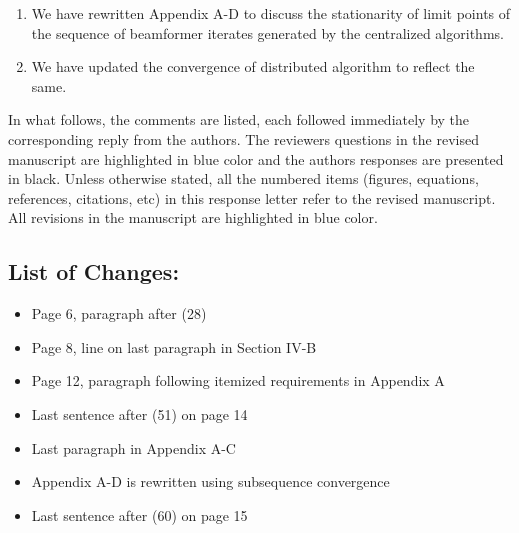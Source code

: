 \begin{enumerate}
	\item We have rewritten Appendix A-D to discuss the stationarity of limit points of the sequence of beamformer iterates generated by the centralized algorithms.
	\item We have updated the convergence of distributed algorithm to reflect the same.
\end{enumerate}

In what follows, the comments are listed, each followed immediately by the corresponding reply from the authors. The reviewers questions in the revised manuscript are highlighted in blue color and the authors responses are presented in black. Unless otherwise stated, all the numbered items (figures, equations, references, citations, etc) in this response letter refer to the revised manuscript. All revisions in the manuscript are highlighted in blue color.

\subsection*{List of Changes:}
\vspace*{1eM}
\begin{itemize}
	\item Page 6, paragraph after (28)
	\item Page 8,  line on last paragraph in Section IV-B
	\item Page 12, paragraph following itemized requirements in Appendix A
	\item Last sentence after (51) on page 14
	\item Last paragraph in Appendix A-C
	\item Appendix A-D is rewritten using subsequence convergence
	\item Last sentence after (60) on page 15
\end{itemize}